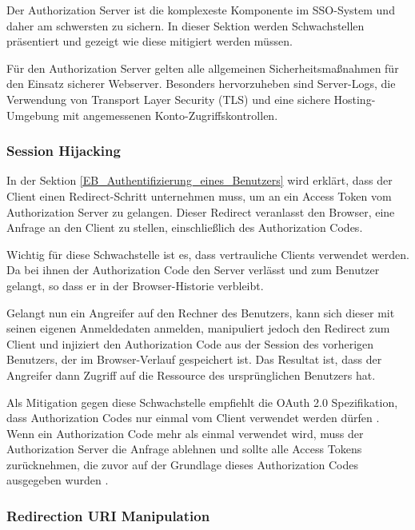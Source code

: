 Der Authorization Server ist die komplexeste Komponente im SSO-System und daher am schwersten zu sichern. In dieser Sektion werden Schwachstellen präsentiert und gezeigt wie diese mitigiert werden müssen.

Für den Authorization Server gelten alle allgemeinen Sicherheitsmaßnahmen für den Einsatz sicherer Webserver. Besonders hervorzuheben sind Server-Logs, die Verwendung von Transport Layer Security (TLS) und eine sichere Hosting-Umgebung mit angemessenen Konto-Zugriffskontrollen.

\subsubsection{Session Hijacking}

In der Sektion \ref{EB_Authentifizierung_eines_Benutzers} wird erklärt, dass der Client einen Redirect-Schritt unternehmen muss, um an ein Access Token vom Authorization Server zu gelangen. Dieser Redirect veranlasst den Browser, eine Anfrage an den Client zu stellen, einschließlich des Authorization Codes.


Wichtig für diese Schwachstelle ist es, dass vertrauliche Clients verwendet werden. Da bei ihnen der Authorization Code den Server verlässt und zum Benutzer gelangt, so dass er in der Browser-Historie verbleibt.

Gelangt nun ein Angreifer auf den Rechner des Benutzers, kann sich dieser mit seinen eigenen Anmeldedaten anmelden, manipuliert jedoch den Redirect zum Client und injiziert den Authorization Code aus der Session des vorherigen Benutzers, der im Browser-Verlauf gespeichert ist. Das Resultat ist, dass der Angreifer dann Zugriff auf die Ressource des ursprünglichen Benutzers hat.

Als Mitigation gegen diese Schwachstelle empfiehlt die OAuth 2.0 Spezifikation, dass Authorization Codes nur einmal vom Client verwendet werden dürfen \cite{OAuthAuthorizationResponse}. Wenn ein Authorization Code mehr als einmal verwendet wird, muss der Authorization Server die Anfrage ablehnen und sollte alle Access Tokens zurücknehmen, die zuvor auf der Grundlage dieses Authorization Codes ausgegeben wurden \cite{OAuthAuthorizationResponse}.

\subsubsection{Redirection URI Manipulation}

